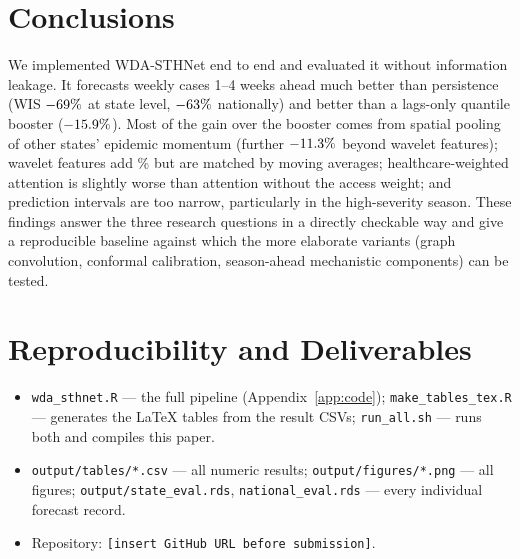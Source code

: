 \documentclass[11pt,a4paper]{article}
\begin{document}
\section{Conclusions}
We implemented WDA-STHNet end to end and evaluated it without information leakage. It forecasts weekly cases 1--4 weeks ahead much better than persistence (WIS $-69\%$ at state level, $-63\%$ nationally) and better than a lags-only quantile booster ($-15.9\%$). Most of the gain over the booster comes from spatial pooling of other states' epidemic momentum (further $-11.3\%$ beyond wavelet features); wavelet features add \gainWavLags\% but are matched by moving averages; healthcare-weighted attention is slightly worse than attention without the access weight; and prediction intervals are too narrow, particularly in the high-severity season. These findings answer the three research questions in a directly checkable way and give a reproducible baseline against which the more elaborate variants (graph convolution, conformal calibration, season-ahead mechanistic components) can be tested.

\section*{Reproducibility and Deliverables}
\begin{itemize}
\item \texttt{wda\_sthnet.R} --- the full pipeline (Appendix~\ref{app:code}); \texttt{make\_tables\_tex.R} --- generates the LaTeX tables from the result CSVs; \texttt{run\_all.sh} --- runs both and compiles this paper.
\item \texttt{output/tables/*.csv} --- all numeric results; \texttt{output/figures/*.png} --- all figures; \texttt{output/state\_eval.rds}, \texttt{national\_eval.rds} --- every individual forecast record.
\item Repository: \texttt{[insert GitHub URL before submission]}.
\end{itemize}
\end{document}
